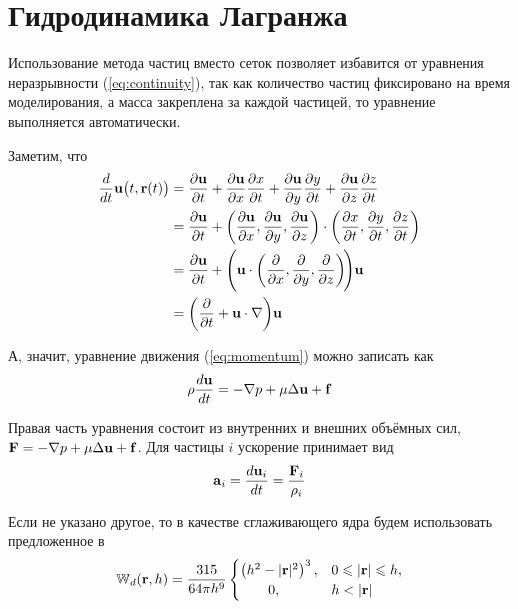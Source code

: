 \section{Гидродинамика Лагранжа}
Использование метода частиц вместо сеток позволяет избавится от уравнения неразрывности (\ref{eq:continuity}), так как количество частиц фиксировано на время моделирования, а масса закреплена за каждой частицей, то уравнение выполняется автоматически.

Заметим, что
\begin{align}
  \begin{split}
    \frac{d}{dt}\boldsymbol{\mathbf{u}}\big(t, \boldsymbol{\mathbf{r}}(t)\big)&=\frac{\partial\boldsymbol{\mathbf{u}}}{\partial t}+\frac{\partial\boldsymbol{\mathbf{u}}}{\partial x}\frac{\partial x}{\partial t}+\frac{\partial\boldsymbol{\mathbf{u}}}{\partial y}\frac{\partial y}{\partial t}+\frac{\partial\boldsymbol{\mathbf{u}}}{\partial z}\frac{\partial z}{\partial t}\\
    &=\frac{\partial\boldsymbol{\mathbf{u}}}{\partial t}+\bigg(\frac{\partial\boldsymbol{\mathbf{u}}}{\partial x}, \frac{\partial\boldsymbol{\mathbf{u}}}{\partial y}, \frac{\partial\boldsymbol{\mathbf{u}}}{\partial z}\bigg)\cdot\bigg(\frac{\partial x}{\partial t}, \frac{\partial y}{\partial t}, \frac{\partial z}{\partial t}\bigg)\\
    &=\frac{\partial\boldsymbol{\mathbf{u}}}{\partial t}+\Bigg(\boldsymbol{\mathbf{u}}\cdot\bigg(\frac{\partial}{\partial x}, \frac{\partial}{\partial y}, \frac{\partial}{\partial z}\bigg)\!\Bigg)\boldsymbol{\mathbf{u}}\\
    &=\bigg(\frac{\partial}{\partial t}+\boldsymbol{\mathbf{u}}\cdot\nabla\bigg)\boldsymbol{\mathbf{u}}
  \end{split}
\end{align}

А, значит, уравнение движения (\ref{eq:momentum}) можно записать как
\begin{equation} \label{eq:lagrange}
  \rho\frac{d\boldsymbol{\mathbf{u}}}{dt}=-\nabla p+\mu\Delta\boldsymbol{\mathbf{u}}+\boldsymbol{\mathbf{f}}
\end{equation}

Правая часть уравнения состоит из внутренних и внешних объёмных сил, $\boldsymbol{\mathbf{F}}=-\nabla p+\mu\Delta\boldsymbol{\mathbf{u}}+\boldsymbol{\mathbf{f}}$. Для частицы $i$ ускорение принимает вид
\begin{equation} \label{eq:acceleration}
  \boldsymbol{\mathbf{a}}_i=\frac{d\boldsymbol{\mathbf{u}}_i}{dt}=\frac{\boldsymbol{\mathbf{F}}_i}{\rho_i}
\end{equation}

Если не указано другое, то в качестве сглаживающего ядра будем использовать предложенное в \cite{muller}
\begin{equation}
  \kernel_d(\vect r, h)=\frac{315}{64\pi h^9}
  \begin{cases}
    \left(h^2-|\vect r|^2\right)^3, & 0\leq|\vect r|\leq h, \\
    \qquad 0, & h<|\vect r|
  \end{cases}
\end{equation}


